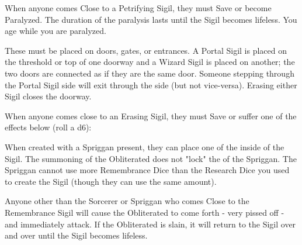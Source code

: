 {

When anyone comes Close to a Petrifying Sigil, they must Save or become Paralyzed.  The duration of the paralysis lasts until the Sigil becomes lifeless. You age while you are paralyzed.


These must be placed on doors, gates, or entrances.  A Portal Sigil is placed on the threshold or top of one doorway and a Wizard Sigil is placed on another; the two doors are connected as if they are the same door.  Someone stepping through the Portal Sigil side will exit through the  side (but not vice-versa).  Erasing either Sigil closes the doorway.





When anyone comes close to an Erasing Sigil, they must Save or suffer one of the effects below (roll a d6):



\newpage



When created with a Spriggan present, they can place one of the  inside of the Sigil.  The summoning of the Obliterated does not "lock" the  of the Spriggan.  The Spriggan cannot use more Remembrance Dice than the Research Dice you used to create the Sigil (though they can use the same amount).  

Anyone other than the Sorcerer or Spriggan who comes Close to the Remembrance Sigil will cause the Obliterated to come forth - very pissed off - and immediately attack.  If the Obliterated is slain, it will return to the Sigil over and over until the Sigil becomes lifeless.




}
